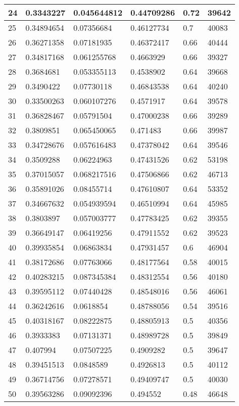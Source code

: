 \begin{longtable}{|l|l|l|l|l|l|}
24 & 0.3343227 & 0.045644812 & 0.44709286 & 0.72 & 39642 \\ \hline 
25 & 0.34894654 & 0.07356684 & 0.46127734 & 0.7 & 40083 \\ \hline 
26 & 0.36271358 & 0.07181935 & 0.46372417 & 0.66 & 40444 \\ \hline 
27 & 0.34817168 & 0.061255768 & 0.4663929 & 0.66 & 39327 \\ \hline 
28 & 0.3684681 & 0.053355113 & 0.4538902 & 0.64 & 39668 \\ \hline 
29 & 0.3490422 & 0.07730118 & 0.46843538 & 0.64 & 40240 \\ \hline 
30 & 0.33500263 & 0.060107276 & 0.4571917 & 0.64 & 39578 \\ \hline 
31 & 0.36828467 & 0.05791504 & 0.47000238 & 0.66 & 39289 \\ \hline 
32 & 0.3809851 & 0.065450065 & 0.471483 & 0.66 & 39987 \\ \hline 
33 & 0.34728676 & 0.057616483 & 0.47378042 & 0.64 & 39546 \\ \hline 
34 & 0.3509288 & 0.06224963 & 0.47431526 & 0.62 & 53198 \\ \hline 
35 & 0.37015057 & 0.068217516 & 0.47506866 & 0.62 & 46713 \\ \hline 
36 & 0.35891026 & 0.08455714 & 0.47610807 & 0.64 & 53352 \\ \hline 
37 & 0.34667632 & 0.054939594 & 0.46510994 & 0.64 & 45985 \\ \hline 
38 & 0.3803897 & 0.057003777 & 0.47783425 & 0.62 & 39355 \\ \hline 
39 & 0.36649147 & 0.06419256 & 0.47911552 & 0.62 & 39523 \\ \hline 
40 & 0.39935854 & 0.06863834 & 0.47931457 & 0.6 & 46904 \\ \hline 
41 & 0.38172686 & 0.07763066 & 0.48177564 & 0.58 & 40015 \\ \hline 
42 & 0.40283215 & 0.087345384 & 0.48312554 & 0.56 & 40180 \\ \hline 
43 & 0.39595112 & 0.07440428 & 0.48548016 & 0.56 & 46061 \\ \hline 
44 & 0.36242616 & 0.0618854 & 0.48788056 & 0.54 & 39516 \\ \hline 
45 & 0.40318167 & 0.08222875 & 0.48805913 & 0.5 & 40356 \\ \hline 
46 & 0.3933383 & 0.07131371 & 0.48989728 & 0.5 & 39849 \\ \hline 
47 & 0.407994 & 0.07507225 & 0.4909282 & 0.5 & 39647 \\ \hline 
48 & 0.39451513 & 0.0848589 & 0.4926813 & 0.5 & 40112 \\ \hline 
49 & 0.36714756 & 0.07278571 & 0.49409747 & 0.5 & 40030 \\ \hline 
50 & 0.39563286 & 0.09092396 & 0.494552 & 0.48 & 46648 \\ \hline 
\end{longtable}